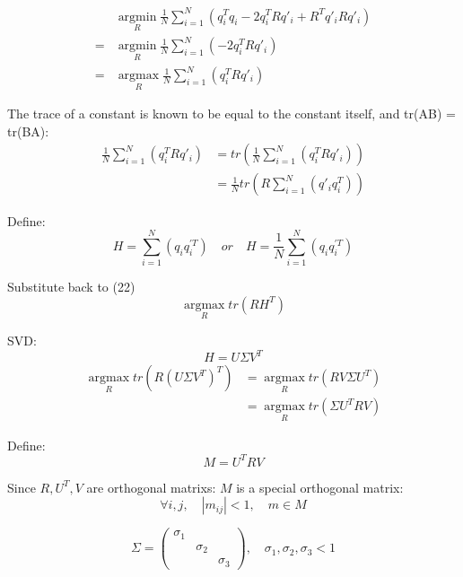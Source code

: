 \documentclass{article}
\begin{document}
\begin{align}
    &\mathop{\arg\min}\limits_{R}\frac{1}{N}\sum^{N}_{i=1}(q_i^Tq_i - 2q_i^TRq'_i + R^Tq'_iRq'_i)\\
    =&\mathop{\arg\min}\limits_{R}\frac{1}{N}\sum^{N}_{i=1}(- 2q_i^TRq'_i)\\
    =&\mathop{\arg\max}\limits_{R}\frac{1}{N}\sum^{N}_{i=1}(q_i^TRq'_i)
\end{align}
\par
The trace of a constant is known to be equal to the constant itself, and tr(AB) = tr(BA):
\begin{align}
\frac{1}{N}\sum^{N}_{i=1}(q_i^TRq'_i)&=tr(\frac{1}{N}\sum^{N}_{i=1}(q_i^TRq'_i))\\
&=\frac{1}{N}tr(R\sum^{N}_{i=1}(q'_iq_i^T))
\end{align}
\par
Define:
\begin{equation}
    H = \sum^{N}_{i=1}(q_iq_i^{\prime T})\quad or \quad H = \frac{1}{N}\sum^{N}_{i=1}(q_iq_i^{\prime T})
\end{equation}
\par
Substitute back to (22)
\begin{equation}
    \mathop{\arg\max}\limits_{R}tr(RH^T)
\end{equation}
\par
SVD:
\begin{equation}
    H = U\Sigma V^T
\end{equation}
\begin{align}
\mathop{\arg\max}\limits_{R}tr(R(U\Sigma V^T)^T)&=\mathop{\arg\max}\limits_{R}tr(RV\Sigma U^T)\\
&=\mathop{\arg\max}\limits_{R}tr(\Sigma U^TRV)
\end{align}
\par
Define:
\begin{equation}
M=U^TRV
\end{equation}
\par
Since $R, U^T, V$ are orthogonal matrixs: $M$ is a special orthogonal matrix:
\begin{equation}
    \forall i,j, \quad |m_{ij}|<1, \quad  m \in M
\end{equation}

\begin{equation}
    \Sigma=
\begin{pmatrix}
    \sigma_1 &  & \\
     & \sigma_2 & \\
    &  & \sigma_3
\end{pmatrix}
,\quad \sigma_1, \sigma_2, \sigma_3 < 1
\end{equation}
\end{document}
